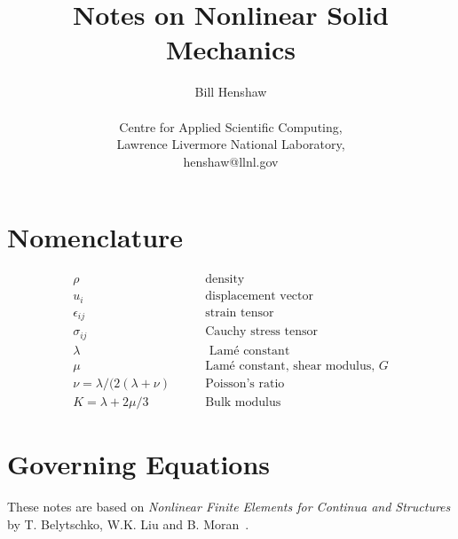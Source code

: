 \documentclass[11pt]{article}
\begin{document}
 
\title{Notes on Nonlinear Solid Mechanics}

\author{
Bill Henshaw \\
\  \\
Centre for Applied Scientific Computing, \\
Lawrence Livermore National Laboratory, \\
henshaw@llnl.gov }
 
\maketitle

\tableofcontents

\section{Nomenclature}
\begin{align}
  \rho & \qquad \mbox{density} \\
  u_i & \qquad \mbox{displacement vector} \\
  \epsilon_{ij} & \qquad \mbox{strain tensor} \\
  \sigma_{ij} & \qquad \mbox{Cauchy stress tensor} \\
  \lambda & \qquad \mbox{ Lam\'e constant} \\
  \mu & \qquad \mbox{Lam\'e constant, shear modulus, $G$}\\
  \nu = \lambda/(2(\lambda+\nu) &  \qquad \mbox{Poisson's ratio}\\
  K  = \lambda + 2\mu/3 &  \qquad \mbox{Bulk modulus}
\end{align}

\clearpage 
\section{Governing Equations}

These notes are based on {\em Nonlinear Finite Elements for Continua and Structures} by
T. Belytschko, W.K. Liu and B. Moran~\cite{Belytschko2005}.
\end{document}
